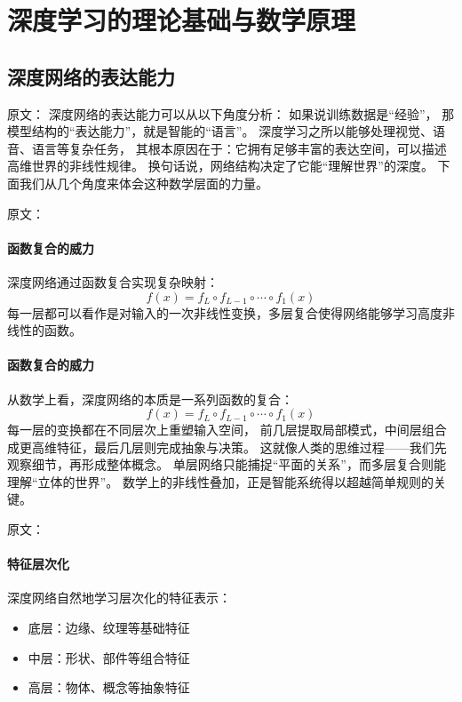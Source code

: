 \section{深度学习的理论基础与数学原理}

\subsection{深度网络的表达能力}

原文：
深度网络的表达能力可以从以下角度分析：
如果说训练数据是“经验”，  
那模型结构的“表达能力”，就是智能的“语言”。  
深度学习之所以能够处理视觉、语音、语言等复杂任务，  
其根本原因在于：它拥有足够丰富的表达空间，可以描述高维世界的非线性规律。  
换句话说，网络结构决定了它能“理解世界”的深度。  
下面我们从几个角度来体会这种数学层面的力量。

原文：
\paragraph{函数复合的威力}
深度网络通过函数复合实现复杂映射：
\begin{equation}
f(x) = f_L \circ f_{L-1} \circ \cdots \circ f_1(x)
\end{equation}
每一层都可以看作是对输入的一次非线性变换，多层复合使得网络能够学习高度非线性的函数。
\paragraph{函数复合的威力}  
从数学上看，深度网络的本质是一系列函数的复合：  
\begin{equation}
f(x) = f_L \circ f_{L-1} \circ \cdots \circ f_1(x)
\end{equation}
每一层的变换都在不同层次上重塑输入空间，  
前几层提取局部模式，中间层组合成更高维特征，最后几层则完成抽象与决策。  
这就像人类的思维过程——我们先观察细节，再形成整体概念。  
单层网络只能捕捉“平面的关系”，而多层复合则能理解“立体的世界”。  
数学上的非线性叠加，正是智能系统得以超越简单规则的关键。

原文：
\paragraph{特征层次化}
深度网络自然地学习层次化的特征表示：
\begin{itemize}
\item 底层：边缘、纹理等基础特征
\item 中层：形状、部件等组合特征
\item 高层：物体、概念等抽象特征
\end{itemize}
